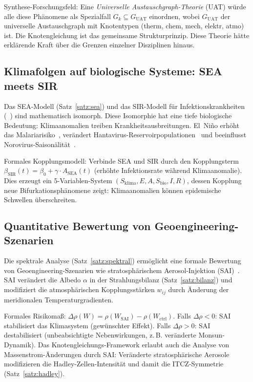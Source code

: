 ﻿\documentclass[a4paper,12pt]{article}
\theoremstyle{definition}
\begin{document}
Synthese-Forschungsfeld: Eine \emph{Universelle Austauschgraph-Theorie} (UAT) w\"urde
alle diese Ph\"anomene als Spezialfall $G_k \subseteq G_{\mathrm{UAT}}$ einordnen,
wobei $G_{\mathrm{UAT}}$ der universelle Austauschgraph mit Knotentypen
(therm, chem, mech, elektr, atmo) ist. Die Knotengleichung ist das gemeinsame
Strukturprinzip. Diese Theorie h\"atte erkl\"arende Kraft \"uber die Grenzen
einzelner Disziplinen hinaus.

\subsection{Klimafolgen auf biologische Systeme: SEA meets SIR}

Das SEA-Modell (Satz~\ref{satz:sea}) und das SIR-Modell f\"ur Infektionskrankheiten
(~\cite{epp2026r0, epp2026hantavirus}) sind mathematisch isomorph.
Diese Isomorphie hat eine tiefe biologische Bedeutung: Klimaanomalien treiben
Krankheitsausbreitungen. El~Ni\~no erh\"oht das Malariarisiko~\cite{pascual2000},
ver\"andert Hantavirus-Reservoirpopulationen~\cite{epp2026hantavirus} und beeinflusst
Norovirus-Saison\"alit\"at~\cite{epp2026norovirus}.

Formales Kopplungsmodell: Verbinde SEA und SIR durch den Kopplungsterm
$\beta_{\mathrm{SIR}}(t) = \beta_0 + \gamma \cdot A_{\mathrm{SEA}}(t)$
(erh\"ohte Infektionsrate w\"ahrend Klimaanomalie). Dies erzeugt ein
5-Variablen-System $(S_{\mathrm{klima}}, E, A, S_{\mathrm{bio}}, I, R)$,
dessen Kopplung neue Bifurkationsph\"anomene zeigt:
Klimaanomalien k\"onnen epidemische Schwellen \"uberschreiten.

\subsection{Quantitative Bewertung von Geoengineering-Szenarien}

Die spektrale Analyse (Satz~\ref{satz:spektral}) erm\"oglicht eine formale Bewertung
von Geoengineering-Szenarien wie stratosph\"arischem Aerosol-Injektion (SAI)~\cite{robock2009}.
SAI ver\"andert die Albedo $\alpha$ in der Strahlungsbilanz (Satz~\ref{satz:bilanz})
und modifiziert die atmosph\"arischen Kopplungsst\"arken $w_{ij}$ durch \"Anderung
der meridionalen Temperaturgradienten.

Formales Risikoma{\ss}: $\Delta\rho(W) = \rho(W_{\mathrm{SAI}}) - \rho(W_{\mathrm{ctrl}})$.
Falls $\Delta\rho < 0$: SAI stabilisiert das Klimasystem (gew\"unschter Effekt).
Falls $\Delta\rho > 0$: SAI destabilisiert (unbeabsichtigte Nebenwirkungen,
z.\,B. ver\"anderte Monsun-Dynamik). Das Knotengleichungs-Framework erlaubt
auch die Analyse von Massenstrom-\"Anderungen durch SAI: Ver\"anderte stratosph\"arische
Aerosole modifizieren die Hadley-Zellen-Intensit\"at und damit die
ITCZ-Symmetrie (Satz~\ref{satz:hadley}).
\end{document}
